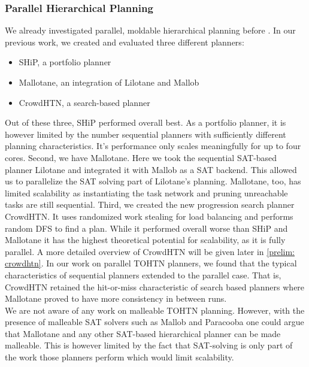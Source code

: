 \subsubsection{Parallel Hierarchical Planning}
We already investigated parallel, moldable hierarchical planning before \cite{bretl2021parallel}. In our previous work, we created and evaluated three different planners:
\begin{itemize}
	\item SHiP, a portfolio planner
	\item Mallotane, an integration of Lilotane and Mallob
	\item CrowdHTN, a search-based planner
\end{itemize}
Out of these three, SHiP performed overall best. As a portfolio planner, it is however limited by the number sequential planners with sufficiently different planning characteristics. It's performance only scales meaningfully for up to four cores. Second, we have Mallotane. Here we took the sequential SAT-based planner Lilotane and integrated it with Mallob as a SAT backend. This allowed us to parallelize the SAT solving part of Lilotane's planning. Mallotane, too, has limited scalability as instantiating the task network and pruning unreachable tasks are still sequential. Third, we created the new progression search planner CrowdHTN. It uses randomized work stealing for load balancing and performs random DFS to find a plan. While it performed overall worse than SHiP and Mallotane it has the highest theoretical potential for scalability, as it is fully parallel. A more detailed overview of CrowdHTN will be given later in \ref{prelim: crowdhtn}.
In our work on parallel TOHTN planners, we found that the typical characteristics of sequential planners extended to the parallel case. That is, CrowdHTN retained the hit-or-miss characteristic of search based planners where Mallotane proved to have more consistency in between runs. \\
We are not aware of any work on malleable TOHTN planning. However, with the presence of malleable SAT solvers such as Mallob \cite{sanders2022decentralized} and Paracooba \cite{heisinger2020distributed} one could argue that Mallotane and any other SAT-based hierarchical planner can be made malleable. This is however limited by the fact that SAT-solving is only part of the work those planners perform which would limit scalability.